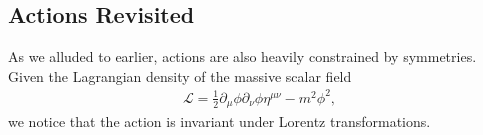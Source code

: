 \subsection{Actions Revisited}

As we alluded to earlier, actions are also heavily constrained by symmetries. Given the Lagrangian density of the massive scalar field
\begin{align*}
    \mathcal{L} = \frac{1}{2} \partial_\mu \phi \partial_\nu \phi \eta^{\mu \nu} - m^2 \phi^2
,\end{align*}
we notice that the action is invariant under Lorentz transformations.









